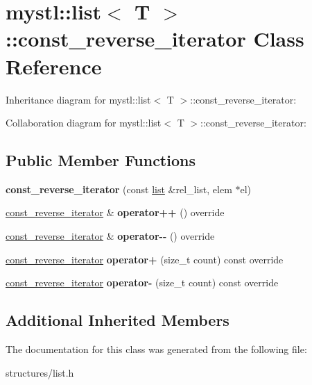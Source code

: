 \hypertarget{classmystl_1_1list_1_1const__reverse__iterator}{}\section{mystl\+:\+:list$<$ T $>$\+:\+:const\+\_\+reverse\+\_\+iterator Class Reference}
\label{classmystl_1_1list_1_1const__reverse__iterator}


Inheritance diagram for mystl\+:\+:list$<$ T $>$\+:\+:const\+\_\+reverse\+\_\+iterator\+:


Collaboration diagram for mystl\+:\+:list$<$ T $>$\+:\+:const\+\_\+reverse\+\_\+iterator\+:
\subsection*{Public Member Functions}
\begin{DoxyCompactItemize}
\item 
\mbox{\label{classmystl_1_1list_1_1const__reverse__iterator_ae7253d0a111c3647c63e308195e17a08}} 
{\bfseries const\+\_\+reverse\+\_\+iterator} (const \hyperlink{classmystl_1_1list}{list} \&rel\+\_\+list, elem $\ast$el)
\item 
\mbox{\label{classmystl_1_1list_1_1const__reverse__iterator_a8c95fc695352b73e3d6eacd22d45f66f}} 
\hyperlink{classmystl_1_1list_1_1const__reverse__iterator}{const\+\_\+reverse\+\_\+iterator} \& {\bfseries operator++} () override
\item 
\mbox{\label{classmystl_1_1list_1_1const__reverse__iterator_a9e04bb5908c42ec02187d8d11191d1d8}} 
\hyperlink{classmystl_1_1list_1_1const__reverse__iterator}{const\+\_\+reverse\+\_\+iterator} \& {\bfseries operator-\/-\/} () override
\item 
\mbox{\label{classmystl_1_1list_1_1const__reverse__iterator_adc321c3bf86f9da7a7cdb72d6d827141}} 
\hyperlink{classmystl_1_1list_1_1const__reverse__iterator}{const\+\_\+reverse\+\_\+iterator} {\bfseries operator+} (size\+\_\+t count) const override
\item 
\mbox{\label{classmystl_1_1list_1_1const__reverse__iterator_ac9ca2b9070a2f4daf0f21a15b8344445}} 
\hyperlink{classmystl_1_1list_1_1const__reverse__iterator}{const\+\_\+reverse\+\_\+iterator} {\bfseries operator-\/} (size\+\_\+t count) const override
\end{DoxyCompactItemize}
\subsection*{Additional Inherited Members}


The documentation for this class was generated from the following file\+:\begin{DoxyCompactItemize}
\item 
structures/list.\+h\end{DoxyCompactItemize}
